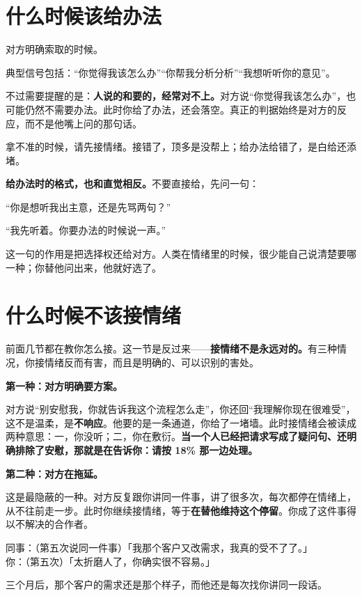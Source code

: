 \section{什么时候该给办法}

对方明确索取的时候。

典型信号包括：“你觉得我该怎么办”“你帮我分析分析”“我想听听你的意见”。

不过需要提醒的是：\textbf{人说的和要的，经常对不上。}对方说“你觉得我该怎么办”，也可能仍然不需要办法。此时你给了办法，还会落空。真正的判据始终是对方的反应，而不是他嘴上问的那句话。

拿不准的时候，请先接情绪。接错了，顶多是没帮上；给办法给错了，是白给还添堵。

\textbf{给办法时的格式，也和直觉相反。}不要直接给，先问一句：

\begin{mdquote}
“你是想听我出主意，还是先骂两句？”

“我先听着。你要办法的时候说一声。”
\end{mdquote}

这一句的作用是把选择权还给对方。人类在情绪里的时候，很少能自己说清楚要哪一种；你替他问出来，他就好选了。

\section{什么时候不该接情绪}

前面几节都在教你怎么接。这一节是反过来——\textbf{接情绪不是永远对的。}有三种情况，你接情绪反而有害，而且是明确的、可以识别的害处。

\textbf{第一种：对方明确要方案。}

对方说“别安慰我，你就告诉我这个流程怎么走”，你还回“我理解你现在很难受”，这不是温柔，是\textbf{不响应}。他要的是一条通道，你给了一堵墙。此时接情绪会被读成两种意思：一，你没听；二，你在敷衍。\textbf{当一个人已经把请求写成了疑问句、还明确排除了安慰，那就是在告诉你：请按 18\% 那一边处理。}

\textbf{第二种：对方在拖延。}

这是最隐蔽的一种。对方反复跟你讲同一件事，讲了很多次，每次都停在情绪上，从不往前走一步。此时你继续接情绪，等于\textbf{在替他维持这个停留}。你成了这件事得以不解决的合作者。

\begin{mdquote}


同事：（第五次说同一件事）「我那个客户又改需求，我真的受不了了。」\\
你：（第五次）「太折磨人了，你确实很不容易。」

三个月后，那个客户的需求还是那个样子，而他还是每次找你讲同一段话。
\end{mdquote}

